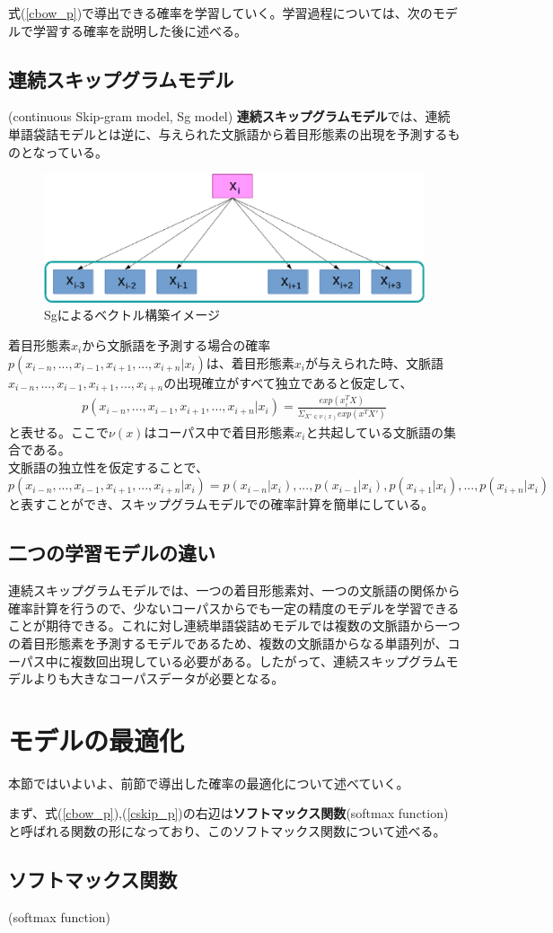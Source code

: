 式(\ref{cbow_p})で導出できる確率を学習していく。学習過程については、次のモデルで学習する確率を説明した後に述べる。

\subsection{連続スキップグラムモデル}(continuous Skip-gram model, Sg model)
\textbf{連続スキップグラムモデル}では、連続単語袋詰モデルとは逆に、与えられた文脈語から着目形態素の出現を予測するものとなっている。
\begin{figure}[h]
  \centering
  \includegraphics[width=12.5cm]{../images/Sg.eps}
  \caption{Sgによるベクトル構築イメージ}
\end{figure}

着目形態素$x_i$から文脈語を予測する場合の確率$p(x_{i-n},...,x_{i-1},x_{i+1},...,x_{i+n}|x_i)$は、着目形態素$x_i$が与えられた時、文脈語$x_{i-n},...,x_{i-1},x_{i+1},...,x_{i+n}$の出現確立がすべて独立であると仮定して、
\begin{eqnarray}
  \label{cskip_p}
  p(x_{i-n},...,x_{i-1},x_{i+1},...,x_{i+n}|x_i) = \frac{exp(x_i^TX)}{\Sigma_{X'\in\nu(x)}exp(x^TX')}
\end{eqnarray}
と表せる。ここで$\nu(x)$はコーパス中で着目形態素$x_i$と共起している文脈語の集合である。\\
文脈語の独立性を仮定することで、$p(x_{i-n},...,x_{i-1},x_{i+1},...,x_{i+n}|x_i) = p(x_{i-n}|x_i),...,p(x_{i-1}|x_i),p(x_{i+1}|x_i),...,p(x_{i+n}|x_i)$と表すことができ、スキップグラムモデルでの確率計算を簡単にしている。

\subsection{二つの学習モデルの違い}
連続スキップグラムモデルでは、一つの着目形態素対、一つの文脈語の関係から確率計算を行うので、少ないコーパスからでも一定の精度のモデルを学習できることが期待できる。これに対し連続単語袋詰めモデルでは複数の文脈語から一つの着目形態素を予測するモデルであるため、複数の文脈語からなる単語列が、コーパス中に複数回出現している必要がある。したがって、連続スキップグラムモデルよりも大きなコーパスデータが必要となる。\cite{book_wm}

\section{モデルの最適化}
本節ではいよいよ、前節で導出した確率の最適化について述べていく。

まず、式(\ref{cbow_p}),(\ref{cskip_p})の右辺は\textbf{ソフトマックス関数}(softmax function)と呼ばれる関数の形になっており、このソフトマックス関数について述べる。

\subsection{ソフトマックス関数}(softmax function)
